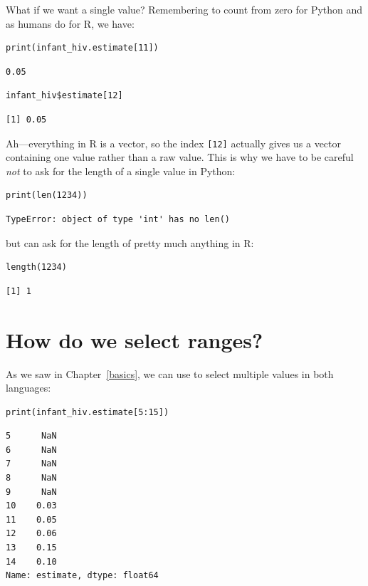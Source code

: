 What if we want a single value?
Remembering to count from zero for Python and as humans do for R,
we have:

\begin{lstlisting}
print(infant_hiv.estimate[11])
\end{lstlisting}

\begin{lstlisting}
0.05
\end{lstlisting}

\begin{lstlisting}
infant_hiv$estimate[12]
\end{lstlisting}

\begin{lstlisting}
[1] 0.05
\end{lstlisting}

\noindent
Ah---everything in R is a vector,
so the index \texttt{[12]} actually gives us a vector containing one value
rather than a raw value.
This is why we have to be careful \emph{not} to ask for the length of a single value in Python:
\begin{lstlisting}
print(len(1234))
\end{lstlisting}

\begin{lstlisting}
TypeError: object of type 'int' has no len()
\end{lstlisting}

\noindent
but can ask for the length of pretty much anything in R:

\begin{lstlisting}
length(1234)
\end{lstlisting}

\begin{lstlisting}
[1] 1
\end{lstlisting}

\section{How do we select ranges?}

As we saw in Chapter~\ref{basics},
we can use  to select multiple values in both languages:

\begin{lstlisting}
print(infant_hiv.estimate[5:15])
\end{lstlisting}

\begin{lstlisting}
5      NaN
6      NaN
7      NaN
8      NaN
9      NaN
10    0.03
11    0.05
12    0.06
13    0.15
14    0.10
Name: estimate, dtype: float64
\end{lstlisting}

